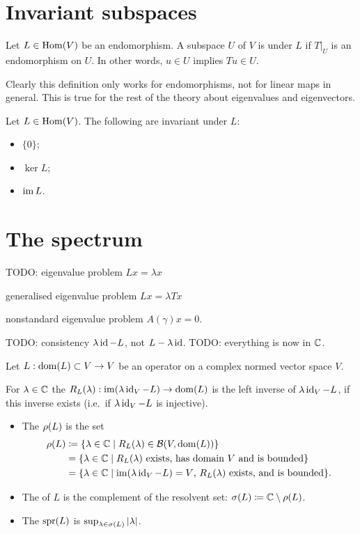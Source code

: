 \section{Invariant subspaces}
\begin{definition}
Let $L\in \operatorname{Hom}(V)$ be an endomorphism. A subspace $U$ of $V$ is  under $L$ if $T|_U$ is an endomorphism on $U$. In other words, $u\in U$ implies $Tu\in U$.
\end{definition}
Clearly this definition only works for endomorphisms, not for linear maps in general. This is true for the rest of the theory about eigenvalues and eigenvectors.
\begin{example}
Let $L\in \operatorname{Hom}(V)$. The following are invariant under $L$:
\begin{itemize}
\item $\{0\}$;
\item $\ker L$;
\item $\operatorname{im} L$.
\end{itemize}
\end{example}

\section{The spectrum}
TODO: eigenvalue problem $Lx = \lambda x$

generalised eigenvalue problem $Lx = \lambda T x$

nonstandard eigenvalue problem $A(\gamma)x = 0$.

TODO: consistency $\lambda \operatorname{id} - L$, not $L-\lambda \operatorname{id}$.
TODO: everything is now in $\mathbb{C}$.

\begin{definition}
Let $L: \operatorname{dom}(L)\subset V \to V$ be an operator on a complex normed vector space $V$.

For $\lambda\in\mathbb{C}$ the  $R_L(\lambda): \operatorname{im}(\lambda \operatorname{id}_V - L)\to\operatorname{dom}(L)$ is the left inverse of $\lambda \operatorname{id}_V - L$, if this inverse exists (i.e.\ if $\lambda \operatorname{id}_V - L$ is injective).
\begin{itemize}
\item The  $\rho(L)$ is the set
\begin{align*}
\res(L) &\defeq \setbuilder{\lambda\in \C}{R_L(\lambda)\in\Bounded(V, \dom(L))} \\
&= \setbuilder{\lambda\in \C}{\text{$R_L(\lambda)$ exists, has domain $V$ and is bounded}} \\
&= \setbuilder{\lambda\in \C}{\text{$\im(\lambda\id_V - L) = V$, $R_L(\lambda)$ exists, and is bounded}}.
\end{align*}
\item The  of $L$ is the complement of the resolvent set: $\sigma(L) \coloneqq \mathbb{C}\setminus\rho(L)$.
\item The  $\operatorname{spr}(L)$ is $\sup_{\lambda\in\sigma(L)} |\lambda|$.
\end{itemize}
\end{definition}

